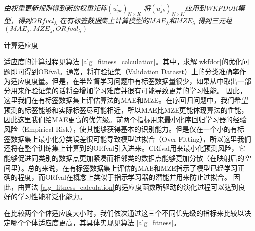 \IncMargin{1em}
\begin{algorithm}[htb]
\BlankLine
\emph{由权重更新规则得到新的权重矩阵$(u_{jk}^{'})_{N \times K}$}\;
\emph{将$(u_{jk}^{'})_{N \times K}$应用到WKFDOR模型，得到$ORfval_{\lambda}$}\;
\emph{在有标签数据集上计算模型的$MAE_{\lambda}$和$MZE_{\lambda}$}\;
\emph{得到三元组$(MAE_{\lambda},MZE_{\lambda},ORfval_{\lambda})$}\;
\caption{计算适应度}\label{alg_fitness_calculation}
\end{algorithm}\DecMargin{1em}



适应度的计算过程见算法 \ref{alg_fitness_calculation}。其中，求解\autoref{wkfdor}的优化问题即可得到ORfval。通常，将在验证集（Validation Dataset）上的分类准确率作为适应度度量。但是，在半监督学习问题中有标签数据量很少，如果从中取出一部分用来作验证集的话将会增加学习难度并很有可能导致更差的学习性能。 因此，这里我们在有标签数据集上评估算法的MAE和MZE。在序回归问题中，我们希望预测的标签能够和实际标签尽可能相近，所以MAE比MZE更能体现算法的性能，因此这里我们给MAE更高的优先级。前两个指标用来最小化序回归学习器的经验风险（Empirical Risk），使其能够获得基本的识别能力。但是仅在一个小的有标签数据集上最小化分类误差很可能导致模型过拟合（Over-Fitting），所以这里我们还将在整个训练集上计算到的ORfval引入进来。ORfval用来最小化预测风险，它能够促进同类别的数据点更加紧凑而相邻类的数据点能够更加分散（在映射后的空间里）。总的来说，在有标签数据集上评估的MAE和MZE指示了模型已经学习正确的程度，而ORfval在概念上类似于指示学习器的潜能并用来防止过拟合\citep{liu2000evolutionary}\citep{liu2003evolutionary}。
因此，由算法 \ref{alg_fitness_calculation}的适应度函数所驱动的演化过程可以达到良好的学习性能和泛化能力。

在比较两个个体适应度大小时，我们依次通过这三个不同优先级的指标来比较以决定哪个个体适应度更高，其具体实现见算法 \ref{alg_fitness}。


